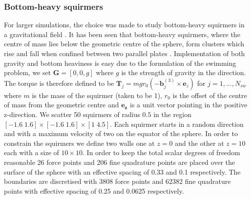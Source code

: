 \subsubsection{Bottom-heavy squirmers}
For larger simulations, the choice was made to study bottom-heavy squirmers in a gravitational field \cite{Ruhle2020EmergentGravity,BrumleyStabilitySquirmers,Pedley2016SphericalMicro-organisms}. It has been seen that bottom-heavy squirmers, where the centre of mass lies below the geometric centre of the sphere, form clusters which rise and fall when confined between two parallel plates \cite{Ruhle2020EmergentGravity}. Implementation of both gravity and bottom heaviness is easy due to the formulation of the swimming problem, we set $\bm{G}=[0,0,g]$ where $g$ is the strength of gravity in the  direction. The torque is therefore defined to be $\bm{T}_j =  m g r_0 ( -\bm{b}_j^{(3)} \times \bm{e}_z)$ for $j=1,...,N_{sw}$ where $m$ is the mass of the squirmer (taken to be 1), $r_0$ is the offset of the centre of mass from the geometric centre and $\bm{e_z}$ is a unit vector pointing in the positive z-direction. We scatter 50 squirmers of radius $0.5$ in the region $[-1.6\; 1.6] \times [-1.6\; 1.6] \times [1\; 4.5]$. Each squirmer starts in a random direction and with a maximum velocity of two on the equator of the sphere. In order to constrain the squirmers we define two walls one at $z=0$ and the other at $z=10$ each with a size of $10 \times 10$. In order to keep the total scalar degrees of freedom reasonable 26 force points and 206 fine quadrature points are placed over the surface of the sphere with an effective spacing of 0.33 and 0.1 respectively. The boundaries are discretised with 3808 force points and 62382 fine quadrature points with effective spacing of 0.25 and 0.0625 respectively. 

